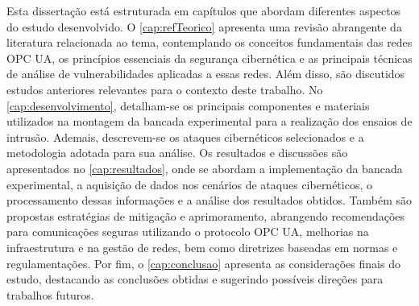     Esta dissertação está estruturada em capítulos que abordam diferentes aspectos do estudo desenvolvido. O \autoref{cap:refTeorico} apresenta uma revisão abrangente da literatura relacionada ao tema, contemplando os conceitos fundamentais das redes OPC UA, os princípios essenciais da segurança cibernética e as principais técnicas de análise de vulnerabilidades aplicadas a essas redes. Além disso, são discutidos estudos anteriores relevantes para o contexto deste trabalho. No \autoref{cap:desenvolvimento}, detalham-se os principais componentes e materiais utilizados na montagem da bancada experimental para a realização dos ensaios de intrusão. Ademais, descrevem-se os ataques cibernéticos selecionados e a metodologia adotada para sua análise. Os resultados e discussões são apresentados no \autoref{cap:resultados}, onde se abordam a implementação da bancada experimental, a aquisição de dados nos cenários de ataques cibernéticos, o processamento dessas informações e a análise dos resultados obtidos. Também são propostas estratégias de mitigação e aprimoramento, abrangendo recomendações para comunicações seguras utilizando o protocolo OPC UA, melhorias na infraestrutura e na gestão de redes, bem como diretrizes baseadas em normas e regulamentações. Por fim, o \autoref{cap:conclusao} apresenta as considerações finais do estudo, destacando as conclusões obtidas e sugerindo possíveis direções para trabalhos futuros.
